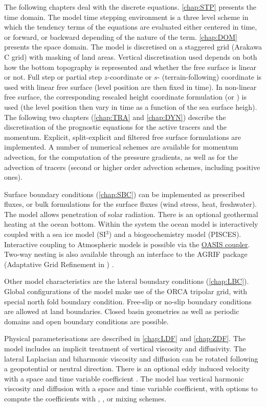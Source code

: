 \documentclass[../main/NEMO_manual]{subfiles}
\begin{document}
The following chapters deal with the discrete equations.
\autoref{chap:STP} presents the time domain.
The model time stepping environment is a three level scheme in which 
the tendency terms of the equations are evaluated either centered in time, or forward, or backward depending of 
the nature of the term.
\autoref{chap:DOM} presents the space domain.
The model is discretised on a staggered grid (Arakawa C grid) with masking of land areas.
Vertical discretisation used depends on both how the bottom topography is represented and whether 
the free surface is linear or not.
Full step or partial step $z$-coordinate or $s$- (terrain-following) coordinate is used with linear free surface 
(level position are then fixed in time).
In non-linear free surface, the corresponding rescaled height coordinate formulation (\zstar or \sstar) is used
(the level position then vary in time as a function of the sea surface heigh).
The following two chapters (\autoref{chap:TRA} and \autoref{chap:DYN}) describe the discretisation of
the prognostic equations for the active tracers and the momentum.
Explicit, split-explicit and filtered free surface formulations are implemented.
A number of numerical schemes are available for momentum advection, 
for the computation of the pressure gradients, as well as for the advection of tracers 
(second or higher order advection schemes, including positive ones).

Surface boundary conditions (\autoref{chap:SBC}) can be implemented as prescribed fluxes, or bulk formulations for 
the surface fluxes (wind stress, heat, freshwater).
The model allows penetration of solar radiation.
There is an optional geothermal heating at the ocean bottom.
Within the \NEMO system the ocean model is interactively coupled with a sea ice model (SI$^3$) and
a biogeochemistry model (PISCES).
Interactive coupling to Atmospheric models is possible via the \href{https://portal.enes.org/oasis}{OASIS coupler}.
Two-way nesting is also available through an interface to the AGRIF package
(Adaptative Grid Refinement in \fortran) \citep{debreu.vouland.ea_CG08}.

Other model characteristics are the lateral boundary conditions (\autoref{chap:LBC}).
Global configurations of the model make use of the ORCA tripolar grid, with special north fold boundary condition.
Free-slip or no-slip boundary conditions are allowed at land boundaries.
Closed basin geometries as well as periodic domains and open boundary conditions are possible.

Physical parameterisations are described in \autoref{chap:LDF} and \autoref{chap:ZDF}.
The model includes an implicit treatment of vertical viscosity and diffusivity.
The lateral Laplacian and biharmonic viscosity and diffusion can be rotated following
a geopotential or neutral direction.
There is an optional eddy induced velocity \citep{gent.mcwilliams_JPO90} with a space and time variable coefficient
\citet{treguier.held.ea_JPO97}.
The model has vertical harmonic viscosity and diffusion with a space and time variable coefficient,
with options to compute the coefficients with \citet{blanke.delecluse_JPO93}, \citet{pacanowski.philander_JPO81}, or 
\citet{umlauf.burchard_JMR03} mixing schemes.
 
\end{document}
